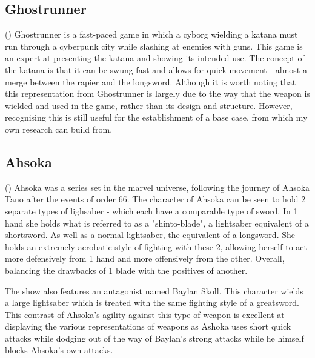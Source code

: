 \documentclass{article}
\begin{document}
\subsection{Ghostrunner}

()
Ghostrunner is a fast-paced game in which a cyborg wielding a katana must run through a cyberpunk city while slashing at enemies with guns. This game is an expert at presenting the katana and showing its intended use. The concept of the katana is that it can be swung fast and allows for quick movement - almost a merge between the rapier and the longsword. Although it is worth noting that this representation from Ghostrunner is largely due to the way that the weapon is wielded and used in the game, rather than its design and structure. However, recognising this is still useful for the establishment of a base case, from which my own research can build from.

\subsection{Ahsoka}

()
Ahsoka was a series set in the marvel universe, following the journey of Ahsoka Tano after the events of order 66. The character of Ahsoka can be seen to hold 2 separate types of lighsaber - which each have a comparable type of sword. In 1 hand she holds what is referred to as a "shinto-blade", a lightsaber equivalent of a shortsword. As well as a normal lightsaber, the equivalent of a longsword. She holds an extremely acrobatic style of fighting with these 2, allowing herself to act more defensively from 1 hand and more offensively from the other. Overall, balancing the drawbacks of 1 blade with the positives of another. 

The show also features an antagonist named Baylan Skoll. This character wields a large lightsaber which is treated with the same fighting style of a greatsword. This contrast of Ahsoka's agility against this type of weapon is excellent at displaying the various representations of weapons as Ashoka uses short quick attacks while dodging out of the way of Baylan's strong attacks while he himself blocks Ahsoka's own attacks.

\pagebreak
\end{document}
